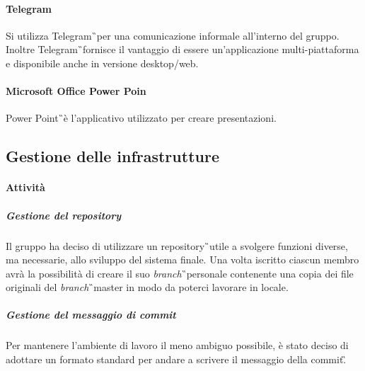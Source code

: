 \paragraph{Telegram} Si utilizza Telegram\G\ per una comunicazione informale all'interno del 
gruppo. Inoltre Telegram\G\ fornisce il vantaggio di essere un'applicazione 
multi-piattaforma e disponibile anche in versione desktop/web.
\paragraph{Microsoft Office Power Poin} Power Point\G\ è l'applicativo utilizzato per creare presentazioni.

\subsection{Gestione delle infrastrutture}

\paragraph{Attività} 
\subparagraph{Gestione del repository} Il gruppo ha deciso di utilizzare un repository\G\ utile a svolgere funzioni diverse, ma necessarie, allo sviluppo del sistema finale. Una volta iscritto ciascun membro avrà la possibilità di creare il suo \textit{branch}\G\ personale contenente una copia dei file originali del \textit{branch}\G\ master in modo da poterci lavorare in locale.

\subparagraph{Gestione del messaggio di commit} Per mantenere l'ambiente di lavoro il meno ambiguo possibile, è stato deciso di adottare un formato standard per andare a scrivere il messaggio della commit\G.

